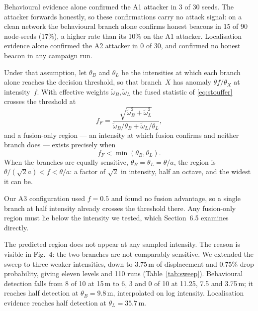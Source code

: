 Behavioural evidence alone confirmed the A1 attacker in 3 of 30 seeds. The
attacker forwards honestly, so these confirmations carry no attack signal:
on a clean network the behavioural branch alone confirms honest beacons in
15 of 90 node-seeds (17\%), a higher rate than its 10\% on the A1
attacker. Localisation evidence alone confirmed the A2 attacker in 0 of 30,
and confirmed no honest beacon in any campaign run.


Under that assumption, let $\theta_B$ and $\theta_L$ be the intensities at
which each branch alone reaches the decision threshold, so that branch~$X$
has anomaly $\theta f/\theta_X$ at intensity~$f$. With effective weights
$\tilde\omega_B, \tilde\omega_L$ the fused statistic of
\eqref{eq:stouffer} crosses the threshold at
\begin{equation}
\label{eq:ffused}
f_F = \frac{\sqrt{\tilde\omega_B^{2} + \tilde\omega_L^{2}}}
           {\tilde\omega_B/\theta_B + \tilde\omega_L/\theta_L},
\end{equation}
and a fusion-only region --- an intensity at which fusion confirms and
neither branch does --- exists precisely when
\begin{equation}
\label{eq:region}
f_F < \min(\theta_B, \theta_L).
\end{equation}
When the branches are equally sensitive, $\theta_B = \theta_L = \theta/a$,
the region is $\theta/(\sqrt{2}a) < f < \theta/a$: a factor of $\sqrt{2}$ in
intensity, half an octave, and the widest it can be.

Our A3 configuration used $f = 0.5$ and found no fusion advantage, so a
single branch at half intensity already crosses the threshold there. Any
fusion-only region must lie below the intensity we tested, which
Section~6.5 examines directly.


The predicted region does not appear at any sampled intensity. The reason
is visible in Fig.~4: the two branches are not comparably sensitive.
We extended the sweep to three weaker intensities, down to 3.75\,m of
displacement and 0.75\% drop probability, giving eleven levels and 110
runs (Table~\ref{tab:sweep}). Behavioural detection falls from 8 of 10 at
15\,m to 6, 3 and 0 of 10 at 11.25, 7.5 and 3.75\,m; it reaches half
detection at $\theta_B = 9.8$\,m, interpolated on log intensity.
Localisation evidence reaches half detection at $\theta_L = 35.7$\,m.

